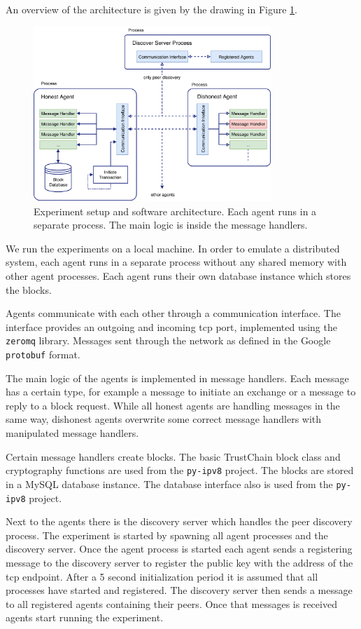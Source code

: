 An overview of the architecture is given by the drawing in Figure \ref{fig:software_architecture}.

\begin{figure}[h!]
  \centering
  \includegraphics[width=0.8\textwidth]{images/architecture-2.pdf}
  \caption{Experiment setup and software architecture. Each agent runs in a separate process. The 
  main logic is inside the message handlers.}
  \label{fig:software_architecture}
\end{figure}

We run the experiments on a local machine. In order to emulate a distributed system, each agent 
runs in a separate process without any shared memory with other agent processes. Each agent runs 
their own database instance which stores the blocks. 

Agents communicate with each other through a communication interface. The interface 
provides an outgoing and incoming tcp port, implemented using the  \verb|zeromq| library. Messages
sent through the network as defined in the Google \verb|protobuf| format. 

The main logic of the agents is implemented in message handlers. Each message has a certain type,
for example a message to initiate an exchange or a message to reply to a block request. While all 
honest agents are handling messages in the same way, dishonest agents overwrite some correct 
message handlers with manipulated message handlers. 

Certain message handlers create blocks. The basic TrustChain block class and cryptography functions
are used from the \verb|py-ipv8| project. The blocks are stored in a MySQL database instance. The 
database interface also is used from the \verb|py-ipv8| project.

Next to the agents there is the discovery server which handles the peer discovery process. The 
experiment is started by spawning all agent processes and the discovery server. Once the agent 
process is started each agent sends a registering message to the discovery server to register the 
public key with the address of the tcp endpoint. After a 5 second initialization period it is assumed
that all processes have started and registered. The discovery server then sends a message to all 
registered agents containing their peers. Once that messages is received agents start running the
experiment. 

